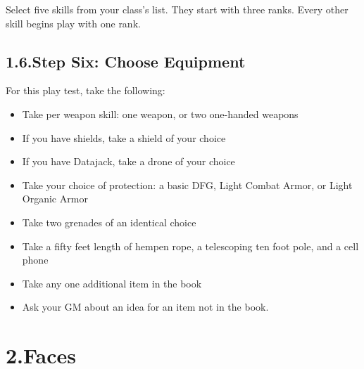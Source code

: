 \documentclass{article}
\begin{document}
\noindent{}Select five skills from your class’s list. They start with three ranks. Every other skill begins play with one rank.%

\subsection{1.6.\hspace*{0.5em}Step Six: Choose Equipment}\label{sec-step-six--choose-equipment}%

\noindent{}For this play test, take the following:%

\begin{itemize}[noitemsep,topsep=\mdcompacttopsep]%

\item{}Take per weapon skill: one weapon, or two one-handed weapons%

\item{}If you have shields, take a shield of your choice%

\item{}If you have Datajack, take a drone of your choice%

\item{}Take your choice of protection: a basic DFG, Light Combat Armor, or Light Organic Armor%

\item{}Take two grenades of an identical choice%

\item{}Take a fifty feet length of hempen rope, a telescoping ten foot pole, and a cell phone%

\item{}Take any one additional item in the book%

\item{}Ask your GM about an idea for an item not in the book.%
\end{itemize}%

\mdhr{}%

\section{2.\hspace*{0.5em}Faces}\label{sec-faces}%
\end{document}
